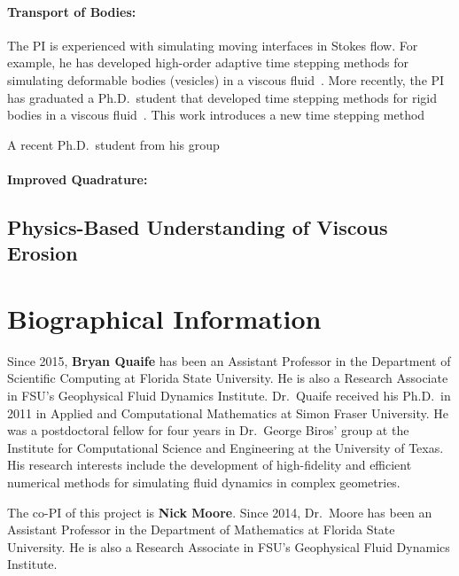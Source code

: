 \documentclass[11pt]{article}
\begin{document}
\paragraph{Transport of Bodies:} The PI is experienced with simulating
moving interfaces in Stokes flow.  For example, he has developed
high-order adaptive time stepping methods for simulating deformable
bodies (vesicles) in a viscous fluid~\cite{qua-bir2015b, qua-bir2014,
qua-2016}.   More recently, the PI has graduated a Ph.D.~student that
developed time stepping methods for rigid bodies in a viscous
fluid~\cite{bys-sha-qua2018}.  This work introduces a new time stepping
method

A recent Ph.D.~student from his group

\paragraph{Improved Quadrature:}


\subsection{Physics-Based Understanding of Viscous Erosion}

\section{Biographical Information}
Since 2015, {\bf Bryan Quaife} has been an Assistant Professor in the
Department of Scientific Computing at Florida State University.  He is
also a Research Associate in FSU's Geophysical Fluid Dynamics Institute.
Dr.~Quaife received his Ph.D.~in 2011 in Applied and Computational
Mathematics at Simon Fraser University.  He was a postdoctoral fellow
for four years in Dr.~George Biros' group at the Institute for
Computational Science and Engineering at the University of Texas.  His
research interests include the development of  high-fidelity and
efficient numerical methods for simulating fluid dynamics in complex
geometries.

The co-PI of this project is {\bf Nick Moore}.  Since 2014, Dr.~Moore
has been an Assistant Professor in the Department of Mathematics at
Florida State University.  He is also a Research Associate in FSU's
Geophysical Fluid Dynamics Institute. 
\end{document}
